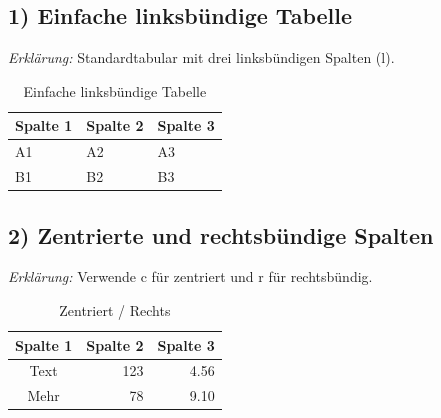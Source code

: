 \documentclass[a4paper,12pt]{article}
\begin{document}
\subsection*{1) Einfache linksbündige Tabelle}
	\textit{Erklärung:} Standardtabular mit drei linksbündigen Spalten (l).	%
\begin{table}[h!]															%
	\centering								                                %
	\caption{Einfache linksbündige Tabelle}                                 %
	\begin{tabular}{lll}                                                    %
	
		Spalte 1 & Spalte 2 & Spalte 3 \\                                   %
		\midrule                                                            %
		A1 & A2 & A3 \\                                                     %
		B1 & B2 & B3 \\                                                     %
		\bottomrule                                                         %
	\end{tabular}                                                           %
\end{table}                                                                 %

\subsection*{2) Zentrierte und rechtsbündige Spalten}
	\textit{Erklärung:} Verwende c für zentriert und r für rechtsbündig.
\begin{table}[h!]
	\centering
	\caption{Zentriert / Rechts}
	\begin{tabular}{crr}
	
		Spalte 1 & Spalte 2 & Spalte 3 \\
		\midrule
		Text & 123 & 4.56 \\
		Mehr & 78 & 9.10 \\
		\bottomrule
	\end{tabular}
\end{table}
\end{document}
